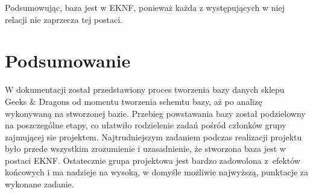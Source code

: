 \documentclass{article}
\begin{document}
	\noindent Podsumowując, baza jest w EKNF, ponieważ każda z występujących w niej relacji nie zaprzecza tej postaci.
	
	\section{Podsumowanie}
	W dokumentacji został przedstawiony proces tworzenia bazy danych sklepu Geeks \& Dragons od momentu tworzenia schemtu bazy, aż po analizę wykonywaną na stworzonej bazie. Przebieg powstawania bazy został podzielowny na poszczególne etapy, co ułatwiło rodzielenie zadań pośród członków grupy zajmującej sie projektem. Najtrudniejszym zadaniem podczas realizacji projektu było przede wszystkim zrozumienie i uzasadnienie, że stworzona baza jest w  postaci EKNF. Ostatecznie grupa projektowa jest bardzo zadowolona z~efektów końcowych i ma nadzieje na wysoką, w domyśle możliwie najwyższą, punktacje za wykonane zadanie.
	
\end{document}
